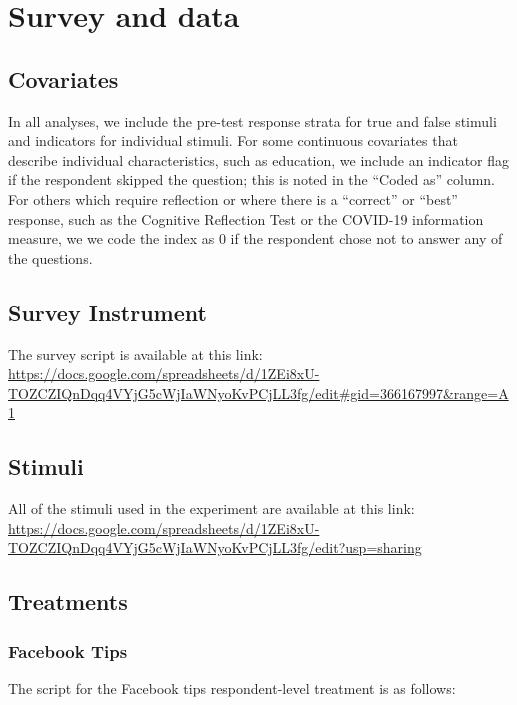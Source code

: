 \documentclass[letterpaper, 12pt, parskip=full,DIV=10]{scrartcl}
\begin{document}
\section{Survey and data}\label{appendix:data}
\subsection{Covariates}\label{appendix:covariates}


In all analyses, we include the pre-test response strata for true and false stimuli and indicators for individual stimuli.
For some continuous covariates that describe individual characteristics, such as education, we include an indicator flag if the respondent skipped the question; this is noted in the ``Coded as'' column. For others which require reflection or where there is a ``correct'' or ``best'' response, such as the Cognitive Reflection Test or the COVID-19 information measure, we we code the index as 0 if the respondent chose not to answer any of the questions. 

\subsection{Survey Instrument}\label{appendix:survey}%
The survey script is available at this link:\\
\url{https://docs.google.com/spreadsheets/d/1ZEi8xU-TOZCZIQnDqq4VYjG5cWjIaWNyoKvPCjLL3fg/edit#gid=366167997&range=A1}

\subsection{Stimuli}\label{appendis:stimuli}
All of the stimuli used in the experiment are available at this link:\\
\url{https://docs.google.com/spreadsheets/d/1ZEi8xU-TOZCZIQnDqq4VYjG5cWjIaWNyoKvPCjLL3fg/edit?usp=sharing}


\subsection{Treatments}

\subsubsection{Facebook Tips}\label{sec:fbtips}
The script for the Facebook tips respondent-level treatment is as follows:
\end{document}
